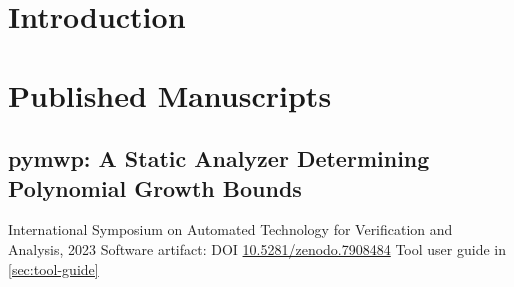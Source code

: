 \documentclass[letterpaper,11pt]{report}
\title{\EDSTITLE}
\author{\EDSAUTHOR}
\date{\today}
\begin{document}
\maketitle\clearpage
\clearpage
\clearpage
\tableofcontents\clearpage
\listoftables\clearpage
\listoffigures\clearpage

\setcounter{chapter}{0}
\chapter{Introduction}\label{ch:introduction}


\chapter{Published Manuscripts}\label{ch:published-manuscripts}\clearpage

\section{pymwp: A Static Analyzer Determining Polynomial Growth Bounds}\label{sec:atva}
{International Symposium on Automated Technology for Verification and Analysis, 2023}
{\newline\noindent Software artifact: DOI \href{https://doi.org/10.5281/zenodo.7908484}{10.5281/zenodo.7908484}
\newline\noindent Tool user guide in \autoref{sec:tool-guide}}
\begin{abstract}
We present pymwp, a static analyzer that automatically computes, if they exist, polynomial bounds relating input and output sizes. In case of exponential growth, our tool detects precisely which dependencies between variables induced it. Based on the sound \mwp-flow calculus, the analysis captures bounds on large classes of programs by being non-deterministic and not requiring termination. For this reason, implementing this calculus required solving several non-trivial implementation problems, to handle its complexity and non-determinism, but also to provide meaningful feedback to the programmer. The duality of the analysis result and compositionality of the calculus make our approach original in the landscape of complexity analyzers. We conclude by demonstrating experimentally how pymwp is a practical and performant static analyzer to automatically evaluate variable growth bounds of \texttt{C} programs.
\end{abstract}\clearpage
\end{document}
